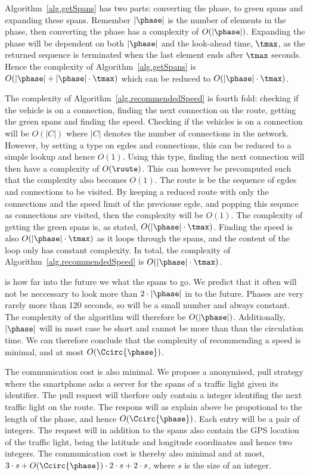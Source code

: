 Algorithm~\ref{alg.getSpans} has two parts: converting the phase, \phase to green spans and expanding these spans.
Remember $|\phase|$ is the number of elements in the phase, then converting the phase has a complexity of $O(|\phase|)$.
Expanding the phase will be dependent on both $|\phase|$ and the look-ahead time, $\tmax$, as the returned sequence is terminated when the last element ends after $\tmax$ seconds.
Hence the complexity of Algorithm~\ref{alg.getSpans} is  $O(|\phase|+ |\phase|\cdot \tmax)$ which can be reduced to $O(|\phase|\cdot \tmax)$.

The complexity of Algorithm~\ref{alg.recommendedSpeed} is fourth fold: checking if the vehicle is on a connection, finding the next connection on the route, getting the green spans and finding the speed.
Checking if the vehicles is on a connection will be $O(|C|)$ where $|C|$ denotes the number of connections in the network.
However, by setting a type on egdes and connections, this can be reduced to a simple lookup and hence $O(1)$.
Using this type, finding the next connection will then have a complexity of $O(\route)$.
This can however be precomputed such that the complexity also becomes $O(1)$.
The route is be the sequence of egdes and connections to be visited.
By keeping a reduced route with only the connections and the speed limit of the previouse egde, and popping this sequnce as connections are visited, then the complexity will be $O(1)$.
The complexity of getting the green spans is, as stated, $O(|\phase|\cdot \tmax)$.
Finding the speed is also $O(|\phase|\cdot \tmax)$ as it loops through the spans, and the content of the loop only has constant complexity.
In total, the complexity of Algorithm~\ref{alg.recommendedSpeed} is $O(|\phase|\cdot\tmax)$.

\tmax is how far into the future we what the spans to go.
We predict that it often will not be neccessary to look more than $2\cdot |\phase|$ in to the future.
Phases are very rarely more than 120 seconds, so \tmax will be a small number and always constant.
The complexity of the algorithm will therefore be $O(|\phase|)$.
Additionally, $|\phase|$ will in most case be short and cannot be more than than the circulation time.
We can therefore conclude that the complexity of recommending a speed is minimal, and at most $O(\Ccirc{\phase})$.

The communication cost is also minimal.
We propose a anonymised, pull strategy where the smartphone asks a server for the spans of a traffic light given its identifier.
The pull request will therfore only contain a integer identifing the next traffic light on the route.
The respons will as explain above be propotional to the length of the phase, and hence $O(\Ccirc{\phase})$.
Each entry will be a pair of integers.
The request will in addition to the spans also contain the GPS location of the traffic light, being the latitude and longitude coordinates and hence two integers.
The communication cost is thereby also minimal and at most, $3\cdot s + O(\Ccirc{\phase})\cdot 2\cdot s + 2\cdot s$, where $s$ is the size of an integer.








